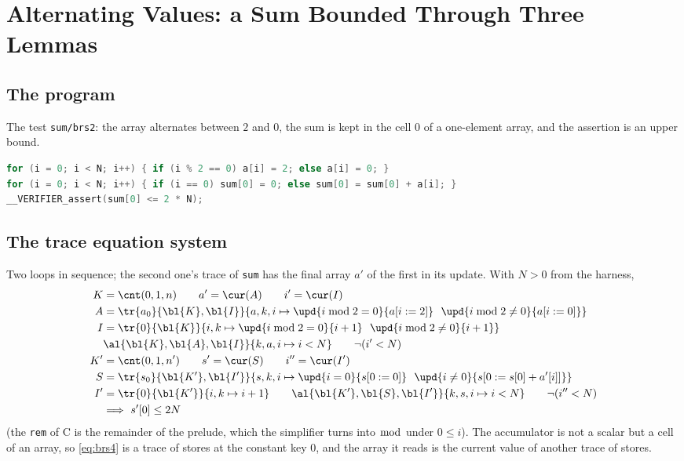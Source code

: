 \section{Alternating Values: a Sum Bounded Through Three Lemmas}\label{sec:brs2}

\subsection{The program}
The test \texttt{sum/brs2}: the array alternates between $2$ and $0$, the sum is kept in the cell $0$ of a
one-element array, and the assertion is an upper bound.
\begin{lstlisting}[language=C]
for (i = 0; i < N; i++) { if (i % 2 == 0) a[i] = 2; else a[i] = 0; }
for (i = 0; i < N; i++) { if (i == 0) sum[0] = 0; else sum[0] = sum[0] + a[i]; }
__VERIFIER_assert(sum[0] <= 2 * N);
\end{lstlisting}

\subsection{The trace equation system}
Two loops in sequence; the second one's trace of \texttt{sum} has the final array $a'$ of the first in its
update. With $N > 0$ from the harness,
\begin{align}
  K &= \cnt(0, 1, n) \qquad a' = \cur(A) \qquad i' = \cur(I) \label{eq:brs0}\\
  A &= \tr{a_0}{\bl{K}, \bl{I}}{a, k, i \mapsto \upd{i \bmod 2 = 0}{a[i := 2]}\ \ \upd{i \bmod 2 \ne 0}{a[i := 0]}} \label{eq:brs1}\\
  I &= \tr{0}{\bl{K}}{i, k \mapsto \upd{i \bmod 2 = 0}{i + 1}\ \ \upd{i \bmod 2 \ne 0}{i + 1}} \label{eq:brs2}\\
  &\al{\bl{K}, \bl{A}, \bl{I}}{k, a, i \mapsto i < N} \qquad \neg(i' < N) \label{eq:brs3}\\
  K' &= \cnt(0, 1, n') \qquad s' = \cur(S) \qquad i'' = \cur(I') \nonumber\\
  S &= \tr{s_0}{\bl{K'}, \bl{I'}}{s, k, i \mapsto \upd{i = 0}{s[0 := 0]}\ \ \upd{i \ne 0}{s[0 := s[0] + a'[i]]}} \label{eq:brs4}\\
  I' &= \tr{0}{\bl{K'}}{i, k \mapsto i + 1} \qquad \al{\bl{K'}, \bl{S}, \bl{I'}}{k, s, i \mapsto i < N} \qquad \neg(i'' < N) \nonumber\\
  &\Longrightarrow\ s'[0] \le 2 N \nonumber
\end{align}
(the \texttt{rem} of C is the remainder of the prelude, which the simplifier turns into $\bmod$ under
$0 \le i$). The accumulator is not a scalar but a cell of an array, so \eqref{eq:brs4} is a trace of stores
at the constant key $0$, and the array it reads is the current value of another trace of stores.

